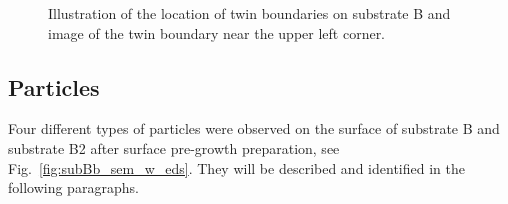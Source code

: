 \begin{figure}[htbp]
    \centering
    \begin{subfigure}[t]{0.4\linewidth}
        \caption{}\label{fig:subBb_twins_illustration}
        \centering
    \end{subfigure}
    \hfill
    \begin{subfigure}[t]{0.5333\linewidth}
        \caption{}\label{fig:subBb_sem_twins}
        \centering
    \end{subfigure}
    \caption[Twin boundaries on substrate B.]{ Illustration of the location of twin boundaries on substrate B and   image of the twin boundary near the upper left corner.}\label{fig:subBb_twin_boundaries}
\end{figure}

\subsection{Particles}

Four different types of particles were observed on the surface of substrate B and substrate B2 after surface pre-growth preparation, see Fig.~\ref{fig:subBb_sem_w_eds}. They will be described and identified in the following paragraphs.

